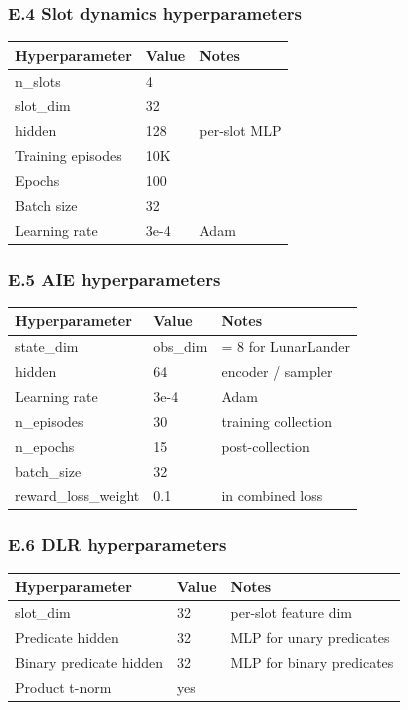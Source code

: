 \documentclass[11pt]{article}
\begin{document}
\subsubsection{E.4 Slot dynamics hyperparameters}

\begin{tabular}{lll}
Hyperparameter & Value & Notes \\
\hline
n\_slots & 4 &  \\
slot\_dim & 32 &  \\
hidden & 128 & per-slot MLP \\
Training episodes & 10K &  \\
Epochs & 100 &  \\
Batch size & 32 &  \\
Learning rate & 3e-4 & Adam \\
\end{tabular}


\subsubsection{E.5 AIE hyperparameters}

\begin{tabular}{lll}
Hyperparameter & Value & Notes \\
\hline
state\_dim & obs\_dim & = 8 for LunarLander \\
hidden & 64 & encoder / sampler \\
Learning rate & 3e-4 & Adam \\
n\_episodes & 30 & training collection \\
n\_epochs & 15 & post-collection \\
batch\_size & 32 &  \\
reward\_loss\_weight & 0.1 & in combined loss \\
\end{tabular}


\subsubsection{E.6 DLR hyperparameters}

\begin{tabular}{lll}
Hyperparameter & Value & Notes \\
\hline
slot\_dim & 32 & per-slot feature dim \\
Predicate hidden & 32 & MLP for unary predicates \\
Binary predicate hidden & 32 & MLP for binary predicates \\
Product t-norm & yes &  \\
\end{tabular}
\end{document}
